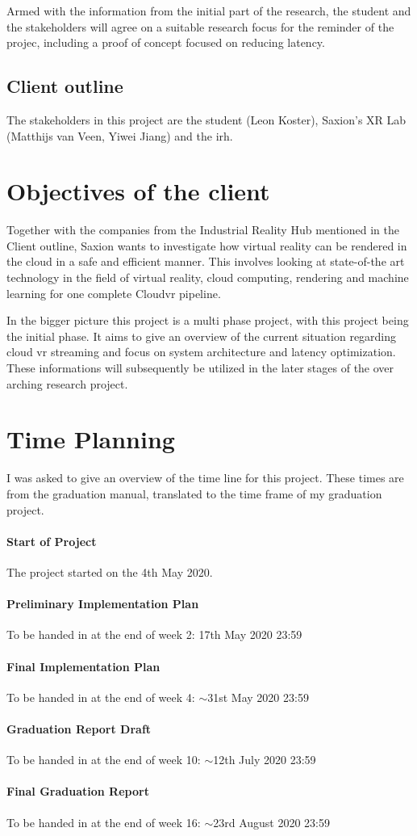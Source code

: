 \documentclass[]{article}
\begin{document}
Armed with the information from the initial part of the research, the student and the stakeholders will agree on a suitable research focus for the reminder of the projec, including a proof of concept focused on reducing latency.
\subsection{Client outline}
The stakeholders in this project are the student (Leon Koster), Saxion's XR Lab (Matthijs van Veen, Yiwei Jiang) and the \acrfull{irh}.
\section{Objectives of the client}
Together with the companies from the Industrial Reality Hub mentioned in the Client outline, Saxion wants to investigate how virtual reality can be rendered in the cloud in a safe and efficient manner. This involves looking at state-of-the art technology in the field of virtual reality, cloud computing, rendering and machine learning for one complete Cloud\acrshort{vr} pipeline. 

In the bigger picture this project is a multi phase project, with this project being the initial phase. It aims to give an overview of the current situation regarding cloud \acrshort{vr} streaming and focus on system architecture and latency optimization. These informations will subsequently be utilized in the later stages of the over arching research project.


\section{Time Planning}
I was asked to give an overview of the time line for this project. These times are from the graduation manual, translated to the time frame of my graduation project. 
\paragraph{Start of Project}
The project started on the 4th May 2020.
\paragraph{Preliminary Implementation Plan}
To be handed in at the end of week 2: 17th May 2020 23:59
\paragraph{Final Implementation Plan}
To be handed in at the end of week 4: $\sim$31st May 2020 23:59
\paragraph{Graduation Report Draft}
To be handed in at the end of week 10: $\sim$12th July 2020 23:59
\paragraph{Final Graduation Report}
To be handed in at the end of week 16: $\sim$23rd August 2020 23:59

\printbibliography
\end{document}
